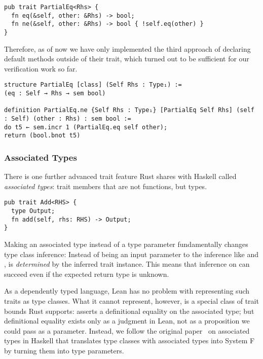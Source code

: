 \begin{verbatim}
pub trait PartialEq<Rhs> {
  fn eq(&self, other: &Rhs) -> bool;
  fn ne(&self, other: &Rhs) -> bool { !self.eq(other) }
}
\end{verbatim}

Therefore, as of now we have only implemented the third approach of declaring
default methods outside of their trait, which turned out to be sufficient for
our verification work so far.

\begin{verbatim}
structure PartialEq [class] (Self Rhs : Type₁) :=
(eq : Self → Rhs → sem bool)

definition PartialEq.ne {Self Rhs : Type₁} [PartialEq Self Rhs] (self : Self) (other : Rhs) : sem bool :=
do t5 ← sem.incr 1 (PartialEq.eq self other);
return (bool.bnot t5)
\end{verbatim}

\subsubsection{Associated Types}

There is one further advanced trait feature Rust shares with Haskell called
\emph{associated types}: trait members that are not functions, but types.

\begin{verbatim}
pub trait Add<RHS> {
  type Output;
  fn add(self, rhs: RHS) -> Output;
}
\end{verbatim}

Making  an associated type instead of a type parameter
fundamentally changes type class inference: Instead of being an input parameter
to the inference like  and ,  is
\emph{determined} by the inferred trait instance. This means that inference on
 can succeed even if the expected return type is unknown.

As a dependently typed language, Lean has no problem with representing such
traits as type classes. What it cannot represent, however, is a special class
of trait bounds Rust supports:  asserts a
definitional equality on the associated type; but definitional equality exists
only as a judgment in Lean, not as a proposition we could pass as a parameter.
Instead, we follow the
original paper~\cite{chakravarty2005associated} on associated types in Haskell
that translates type classes with associated types into System F by turning them
into type parameters.

